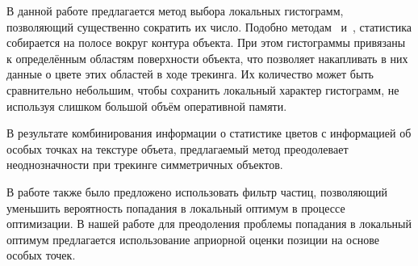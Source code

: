 В данной работе предлагается метод выбора локальных гистограмм, позволяющий
существенно сократить их число.
Подобно методам~\cite{Hexner2016,Tjaden2017,Tjaden2018}
и~\cite{Zhong2018}, статистика собирается на полосе вокруг контура объекта.
При этом гистограммы привязаны к определённым областям поверхности объекта, что позволяет накапливать в них данные о цвете этих областей в ходе трекинга.
Их количество может быть сравнительно небольшим, чтобы сохранить локальный характер гистограмм, не используя слишком большой объём оперативной памяти.

В результате комбинирования информации о статистике цветов с информацией об
особых точках на текстуре объета, предлагаемый метод преодолевает
неоднозначности при трекинге симметричных объектов.

В работе \cite{Zhao2014} также было предложено использовать фильтр частиц,
позволяющий уменьшить вероятность попадания в локальный оптимум в процессе
оптимизации.
В нашей работе для преодоления проблемы попадания в локальный оптимум
предлагается использование априорной оценки позиции на основе особых точек.
